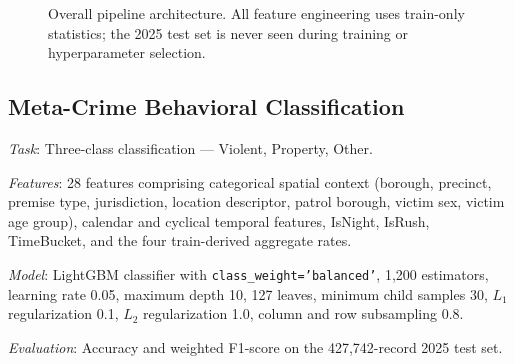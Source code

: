 \documentclass[conference]{IEEEtran}
\begin{document}
\begin{figure}[h]
\centering
{}
\caption{Overall pipeline architecture. All feature engineering uses train-only statistics; the 2025 test set is never seen during training or hyperparameter selection.}
\label{fig:pipeline}
\end{figure}

\subsection{Meta-Crime Behavioral Classification}

\textit{Task}: Three-class classification — Violent, Property, Other.

\textit{Features}: 28 features comprising categorical spatial context (borough, precinct, premise type, jurisdiction, location descriptor, patrol borough, victim sex, victim age group), calendar and cyclical temporal features, IsNight, IsRush, TimeBucket, and the four train-derived aggregate rates.

\textit{Model}: LightGBM \cite{ke2017} classifier with \texttt{class\_weight='balanced'}, 1,200 estimators, learning rate 0.05, maximum depth 10, 127 leaves, minimum child samples 30, $L_1$ regularization 0.1, $L_2$ regularization 1.0, column and row subsampling 0.8.

\textit{Evaluation}: Accuracy and weighted F1-score on the 427,742-record 2025 test set.
\end{document}

